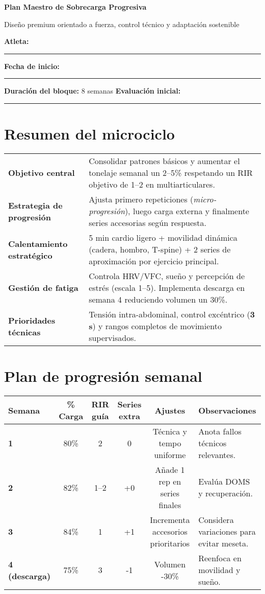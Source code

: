 \documentclass[12pt]{article}
\newcommand{\tempo}[1]{\textcolor{accent}{\textbf{#1}}}
\begin{document}

{\Huge\bfseries\color{primary} Plan Maestro de Sobrecarga Progresiva}\par
{\large\color{textgray}Diseño premium orientado a fuerza, control técnico y adaptación sostenible}

\vspace{1em}
\textbf{Atleta:} \rule{5cm}{0.4pt} \hfill \textbf{Fecha de inicio:} \rule{4cm}{0.4pt}

\textbf{Duración del bloque:} 8 semanas \hfill \textbf{Evaluación inicial:} \rule{3cm}{0.4pt}

\section*{Resumen del microciclo}
\begin{tabularx}{\linewidth}{>{\bfseries\color{primary}}lY}
  Objetivo central & Consolidar patrones básicos y aumentar el tonelaje semanal un 2--5\% respetando un RIR objetivo de 1--2 en multiarticulares.\\
  Estrategia de progresión & Ajusta primero repeticiones (\textit{micro-progresión}), luego carga externa y finalmente series accesorias según respuesta.\\
  Calentamiento estratégico & 5 min cardio ligero + movilidad dinámica (cadera, hombro, T-spine) + 2 series de aproximación por ejercicio principal.\\
  Gestión de fatiga & Controla HRV/VFC, sueño y percepción de estrés (escala 1--5). Implementa descarga en semana 4 reduciendo volumen un 30\%.\\
  Prioridades técnicas & Tensión intra-abdominal, control excéntrico (\tempo{3 s}) y rangos completos de movimiento supervisados.\\
\end{tabularx}

\section*{Plan de progresión semanal}
\begin{tabularx}{\linewidth}{>{\bfseries\color{primary}}l *{4}{C} Y}
  \toprule
  Semana & \% Carga & RIR guía & Series extra & Ajustes & Observaciones \\
   & 80\% & 2 & 0 & Técnica y tempo uniforme & Anota fallos técnicos relevantes.\\
  2 & 82\% & 1--2 & +0 & Añade 1 rep en series finales & Evalúa DOMS y recuperación.\\
  3 & 84\% & 1 & +1 & Incrementa accesorios prioritarios & Considera variaciones para evitar meseta.\\
  4 (descarga) & 75\% & 3 & -1 & Volumen -30\% & Reenfoca en movilidad y sueño.\\
\bottomrule
\end{tabularx}
\end{document}
